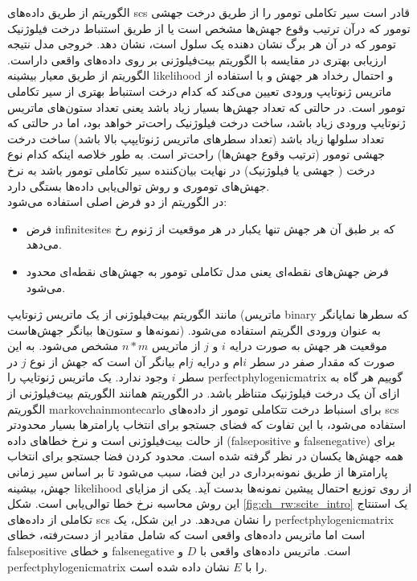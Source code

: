 الگوریتم  از طریق داده‌های \gls{scs} قادر است سیر تکاملی تومور را از طریق درخت جهشی تومور که درآن ترتیب وقوع جهش‌ها مشخص است یا از طریق استنباط درخت فیلوژنیک تومور که در آن هر برگ نشان دهنده یک سلول است، نشان دهد. خروجی مدل  نتیجه ارزیابی بهتری در مقایسه با الگوریتم بیت‌فیلوژنی بر روی داده‌های واقعی داراست. الگوریتم  از طریق معیار بیشینه \gls{likelihood} و احتمال رخداد هر جهش و با استفاده از ماتریس ژنوتایپ ورودی تعیین می‌کند که کدام درخت استنباط بهتری از سیر تکاملی تومور است. در حالتی که تعداد جهش‌ها بسیار زیاد باشد یعنی تعداد ستون‌های ماتریس ژنوتایپ ورودی زیاد باشد، ساخت درخت فیلوژنیک راحت‌تر خواهد بود، اما در حالتی که تعداد سلولها زیاد باشد (تعداد سطرهای ماتریس ژنوتایپپ بالا باشد) ساخت درخت جهشی تومور (ترتیب وقوع جهش‌ها) راحت‌تر است. به طور خلاصه اینکه کدام نوع درخت ( جهشی یا فیلوژنیک) در نهایت بیان‌کننده سیر تکاملی تومور باشد به نرخ جهش‌های توموری و روش توالی‌یابی داده‌ها بستگی دارد.  
\\
در الگوریتم  از دو فرض اصلی استفاده می‌شود: 
\begin{itemize}
	\item     فرض \gls{infinitesites} که بر طبق آن هر جهش تنها یکبار در هر موقعیت از ژنوم رخ ‌می‌دهد. 
	\item	فرض جهش‌های نقطه‌ای یعنی مدل تکاملی تومور به جهش‌های نقطه‌ای محدود می‌شود.  
\end{itemize}
مانند الگوریتم بیت‌فیلوژنی از یک ماتریس ژنوتایپ (ماتریس \gls{binary} که سطرها نمایانگر نمونه‌ها و ستون‌ها بیانگر جهش‌هاست) به عنوان ورودی الگریتم استفاده می‌شود. موقعیت هر جهش به صورت درایه $i$ و $j$ از ماتریس $n*m$ مشخص می‌شود. به این صورت که مقدار صفر در سطر $i$ام و درایه $j$ام بیانگر آن است که جهش از نوع $j$ در سطر $i$ وجود ندارد. یک ماتریس ژنوتایپ را \gls{perfectphylogenicmatrix} گوییم هر گاه به ازای آن یک درخت فیلوژنیک متناظر باشد. در الگوریتم  همانند الگوریتم بیت‌فیلوژنی از الگوریتم \gls{markovchainmontecarlo} برای اسنباط درخت تتکاملی تومور از داده‌های \gls{scs} استفاده می‌شود، با این تفاوت که فضای جستجو برای انتخاب پارامترها بسیار محدودتر از حالت بیت‌فیلوژنی است و نرخ خطاهای داده (\gls{falsepositive} و \gls{falsenegative}) برای همه جهش‌ها یکسان در نظر گرفته شده است. محدود کردن فضا جستجو برای انتخاب پارامترها از طریق نمونه‌برداری در این فضا، سبب می‌شود تا بر اساس سیر زمانی جهش، بیشینه \gls{likelihood} از روی توزیع احتمال پیشین نمونه‌ها بدست آید. یکی از مزایای این روش محاسبه نرخ خطا توالی‌یابی است. شکل \ref{fig:ch_rw:scite_intro} یک استنتاج تکاملی از داده‌های \gls{scs} را نشان می‌دهد. در این شکل،  یک \gls{perfectphylogenicmatrix} است اما  ماتریس داده‌های واقعی است که شامل مقادیر از دست‌رفته، خطای \gls{falsepositive} و خطای \gls{falsenegative}  است. ماتریس داده‌های واقعی با $D$ و \gls{perfectphylogenicmatrix} را با $E$ نشان داده شده است.
 
